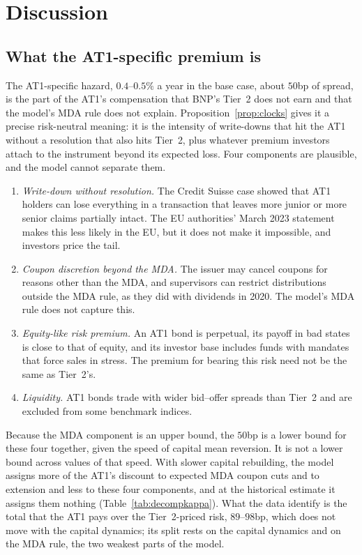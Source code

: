 \section{Discussion}\label{sec:discussion}

\subsection{What the AT1-specific premium is}

The AT1-specific hazard, $0.4$--$0.5\%$ a year in the base case, about $50$bp of spread, is
the part of the AT1's compensation that BNP's Tier~2 does not earn and that the model's MDA
rule does not explain. Proposition~\ref{prop:clocks} gives it a
precise risk-neutral meaning: it is the intensity of write-downs that hit the AT1 without a
resolution that also hits Tier~2, plus whatever premium investors attach to the instrument
beyond its expected loss. Four components are plausible, and the model cannot separate them.
\begin{enumerate}
  \item \emph{Write-down without resolution.} The Credit Suisse case showed that AT1 holders
  can lose everything in a transaction that leaves more junior or more senior claims
  partially intact. The EU authorities' March 2023 statement makes this less likely in the
  EU, but it does not make it impossible, and investors price the tail.
  \item \emph{Coupon discretion beyond the MDA.} The issuer may cancel coupons for reasons
  other than the MDA, and supervisors can restrict distributions outside the MDA rule, as
  they did with dividends in 2020. The model's MDA rule does not capture this.
  \item \emph{Equity-like risk premium.} An AT1 bond is perpetual, its payoff in bad states is
  close to that of equity, and its investor base includes funds with mandates that force
  sales in stress. The premium for bearing this risk need not be the same as Tier~2's.
  \item \emph{Liquidity.} AT1 bonds trade with wider bid--offer spreads than Tier~2 and are
  excluded from some benchmark indices.
\end{enumerate}
Because the MDA component is an upper bound, the $50$bp is a lower bound for these four
together, given the speed of capital mean reversion. It is not a lower bound across values
of that speed. With slower capital rebuilding, the model assigns more of the AT1's discount
to expected MDA coupon cuts and to extension and less to these four components, and at the
historical estimate it assigns them nothing (Table~\ref{tab:decompkappa}). What the data
identify is the total that the AT1 pays over the Tier~2-priced risk, $89$--$98$bp, which
does not move with the capital dynamics; its split rests on the capital dynamics and on
the MDA rule, the two weakest parts of the model.

